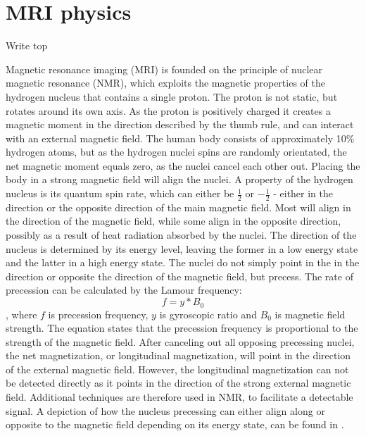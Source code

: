 \section{MRI physics}

 {\Large Write top}
 
Magnetic resonance imaging (MRI) is founded on the principle of nuclear magnetic resonance (NMR), which exploits the magnetic properties of the hydrogen nucleus that contains a single proton. The proton is not static, but rotates around its own axis. As the proton is positively charged it creates a magnetic moment in the direction described by the thumb rule, and can interact with an external magnetic field. The human body consists of approximately 10\% hydrogen atoms, but as the hydrogen nuclei spins are randomly orientated, the net magnetic moment equals zero, as the nuclei cancel each other out. Placing the body in a strong magnetic field will align the nuclei. A property of the hydrogen nucleus is its quantum spin rate, which can either be $ \frac{1}{2}$ or $- \frac{1}{2}$ - either in the direction or the opposite direction of the main magnetic field. Most will align in the direction of the magnetic field, while some align in the opposite direction, possibly as a result of heat radiation absorbed by the nuclei. The direction of the nucleus is determined by its energy level, leaving the former in a low energy state and the latter in a high energy state. The nuclei do not simply point in the in the direction or opposite the direction of the magnetic field, but precess. \cite{Bharath2008} The rate of precession can be calculated by the Lamour frequency:
\begin{equation} \label{eq:lamour}
f=y*B_0
\end{equation} 
, where $f$ is precession frequency, $y$ is gyroscopic ratio and $B_0$ is magnetic field strength. The equation states that the precession frequency is proportional to the strength of the magnetic field. After canceling out all opposing precessing nuclei, the net magnetization, or longitudinal magnetization, will point in the direction of the external magnetic field. However, the longitudinal magnetization can not be detected directly as it points in the direction of the strong external magnetic field. Additional techniques are therefore used in NMR, to facilitate a detectable signal. \cite{Bharath2008} A depiction of how the nucleus precessing can either align along or opposite to the magnetic field depending on its energy state, can be found in .  \\

